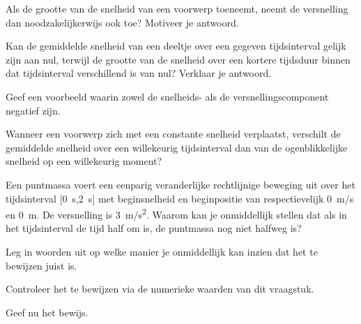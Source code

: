 \documentclass{ximera}
\begin{document}
	\author{Bart Lambregs}
    \xmsource\xmuitleg

\begin{exercise}
	Als de grootte van de snelheid van een voorwerp toeneemt, neemt de versnelling dan noodzakelijkerwijs ook toe? Motiveer je antwoord.
\end{exercise}

\begin{exercise}
	Kan de gemiddelde snelheid van een deeltje over een gegeven tijdsinterval gelijk zijn aan nul, terwijl de grootte van de snelheid over een kortere tijdsduur binnen dat tijdsinterval verschillend is van nul? Verklaar je antwoord.
\end{exercise}

\begin{exercise}
	Geef een voorbeeld waarin zowel de snelheids- als de versnellingscomponent negatief zijn.
\end{exercise}

\begin{exercise}
	Wanneer een voorwerp zich met een constante snelheid verplaatst, verschilt de gemiddelde snelheid over een willekeurig tijdsinterval dan van de ogenblikkelijke snelheid op een willekeurig moment?
\end{exercise}



\begin{exercise}
    Een puntmassa voert een eenparig veranderlijke rechtlijnige beweging uit over het tijdsinterval [\SI{0}{s},\SI{2}{s}] met beginsnelheid en beginpositie van respectievelijk \SI{0}{m/s} en \SI{0}{m}. De versnelling is \SI{3}{m/s^2}. Waarom kan je onmiddellijk stellen dat als in het tijdsinterval de tijd half om is, de puntmassa nog niet halfweg is?
    \begin{question} Leg in woorden uit op welke manier je onmiddellijk kan inzien dat het te bewijzen juist is. \end{question}
    \begin{question} Controleer het te bewijzen via de numerieke waarden van dit vraagstuk.                      \end{question}
    \begin{question} Geef nu het bewijs.                                                                         \end{question}
\end{exercise}
\end{document}
